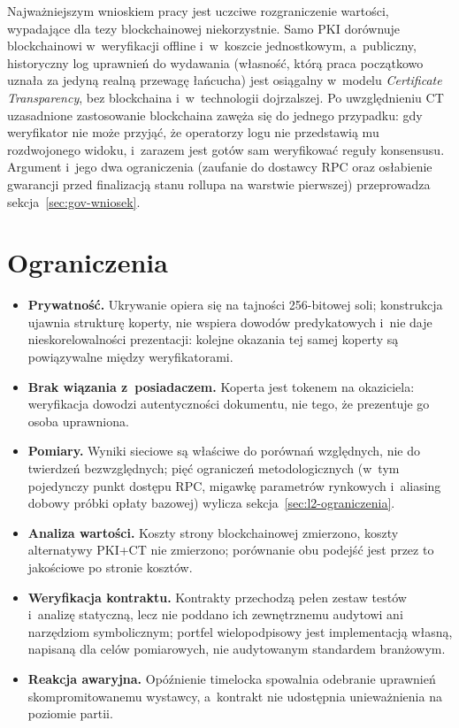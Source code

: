 Najważniejszym wnioskiem pracy jest uczciwe rozgraniczenie wartości, wypadające
dla tezy blockchainowej niekorzystnie. Samo PKI dorównuje blockchainowi
w~weryfikacji offline i~w~koszcie jednostkowym, a~publiczny, historyczny log
uprawnień do wydawania (własność, którą praca początkowo uznała za jedyną
realną przewagę łańcucha) jest osiągalny w~modelu \emph{Certificate
Transparency}, bez blockchaina i~w~technologii dojrzalszej. Po uwzględnieniu CT
uzasadnione zastosowanie blockchaina zawęża się do jednego przypadku: gdy
weryfikator nie może przyjąć, że operatorzy logu nie przedstawią mu
rozdwojonego widoku, i~zarazem jest gotów sam weryfikować reguły konsensusu.
Argument i~jego dwa ograniczenia (zaufanie do dostawcy RPC oraz osłabienie
gwarancji przed finalizacją stanu rollupa na warstwie pierwszej) przeprowadza
sekcja~\ref{sec:gov-wniosek}.

\section{Ograniczenia}
\label{sec:ograniczenia}

\begin{itemize}
  \item \textbf{Prywatność.} Ukrywanie opiera się na tajności 256-bitowej soli;
        konstrukcja ujawnia strukturę koperty, nie wspiera dowodów predykatowych
        i~nie daje nieskorelowalności prezentacji: kolejne okazania tej samej
        koperty są powiązywalne między weryfikatorami.
  \item \textbf{Brak wiązania z~posiadaczem.} Koperta jest tokenem na okaziciela:
        weryfikacja dowodzi autentyczności dokumentu, nie tego, że prezentuje go
        osoba uprawniona.
  \item \textbf{Pomiary.} Wyniki sieciowe są właściwe do porównań względnych, nie
        do twierdzeń bezwzględnych; pięć ograniczeń metodologicznych (w~tym
        pojedynczy punkt dostępu RPC, migawkę parametrów rynkowych i~aliasing
        dobowy próbki opłaty bazowej) wylicza
        sekcja~\ref{sec:l2-ograniczenia}.
  \item \textbf{Analiza wartości.} Koszty strony blockchainowej zmierzono,
        koszty alternatywy PKI+CT nie zmierzono; porównanie obu podejść jest przez to
        jakościowe po stronie kosztów.
  \item \textbf{Weryfikacja kontraktu.} Kontrakty przechodzą pełen zestaw testów
        i~analizę statyczną, lecz nie poddano ich zewnętrznemu audytowi ani
        narzędziom symbolicznym; portfel wielopodpisowy jest implementacją własną,
        napisaną dla celów pomiarowych, nie audytowanym standardem branżowym.
  \item \textbf{Reakcja awaryjna.} Opóźnienie timelocka spowalnia odebranie
        uprawnień skompromitowanemu wystawcy, a~kontrakt nie udostępnia
        unieważnienia na poziomie partii.
\end{itemize}

